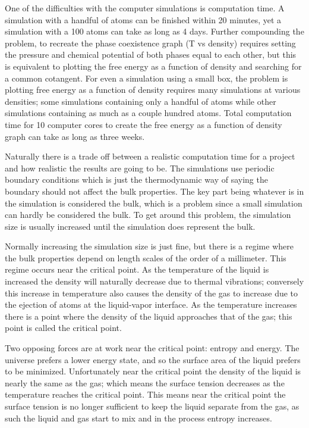 One of the difficulties with the computer simulations is computation time. A simulation with a handful of atoms can be finished within 20 minutes, yet a simulation with a 100 atoms can take as long as 4 days. Further compounding the problem, to recreate the phase coexistence graph (T vs density) requires setting the pressure and chemical potential of both phases equal to each other, but this is equivalent to plotting the free energy as a function of density and searching for a common cotangent. For even a simulation using a small box, the problem is plotting free energy as a function of density requires many simulations at various densities; some simulations containing only a handful of atoms while other simulations containing as much as a couple hundred atoms. Total computation time for 10 computer cores to create the free energy as a function of density graph can take as long as three weeks.

Naturally there is a trade off between a realistic computation time for a project and how realistic the results are going to be. The simulations use periodic boundary conditions which is just the thermodynamic way of saying the boundary should not affect the bulk properties. The key part being whatever is in the simulation is considered the bulk, which is a problem since a small simulation can hardly be considered the bulk. To get around this problem, the simulation size is usually increased until the simulation does represent the bulk. 

Normally increasing the simulation size is just fine, but there is a regime where the bulk properties depend on length scales of the order of a millimeter. This regime occurs near the critical point. As the temperature of the liquid is increased the density will naturally decrease due to thermal vibrations; conversely this increase in temperature also causes the density of the gas to increase due to the ejection of atoms at the liquid-vapor interface. As the temperature increases there is a point where the density of the liquid approaches that of the gas; this point is called the critical point.

Two opposing forces are at work near the critical point: entropy and energy. The universe prefers a lower energy state, and so the surface area of the liquid prefers to be minimized. Unfortunately near the critical point the density of the liquid is nearly the same as the gas; which means the surface tension decreases as the temperature reaches the critical point. This means near the critical point the surface tension is no longer sufficient to keep the liquid separate from the gas, as such the liquid and gas start to mix and in the process entropy increases. 

